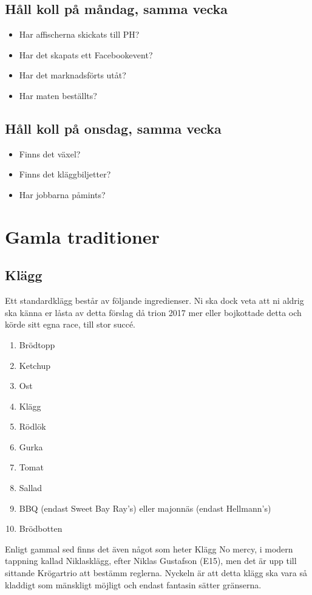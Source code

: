 \documentclass[10pt]{article}
\begin{document}
\subsection*{Håll koll på måndag, samma vecka}
\begin{itemize}
    \item Har affischerna skickats till PH?
	\item Har det skapats ett Facebookevent?
	\item Har det marknadsförts utåt?
	\item Har maten beställts?
\end{itemize}

\subsection*{Håll koll på onsdag, samma vecka}
\begin{itemize}
    \item Finns det växel?
    \item Finns det kläggbiljetter?
	\item Har jobbarna påmints?
\end{itemize}

\section{Gamla traditioner}
\subsection{Klägg}
Ett standardklägg består av följande ingredienser. Ni ska dock veta att ni aldrig ska känna er låsta av detta förslag då trion 2017 mer eller bojkottade detta och körde sitt egna race, till stor succé.
\begin{enumerate}
	\item Brödtopp
	\item Ketchup
	\item Ost
	\item Klägg
	\item Rödlök
	\item Gurka
	\item Tomat
	\item Sallad
	\item BBQ (endast Sweet Bay Ray's) eller majonnäs (endast Hellmann's)
	\item Brödbotten
\end{enumerate}
Enligt gammal sed finns det även något som heter Klägg No mercy, i modern tappning kallad Niklasklägg, efter Niklas Gustafson (E15), men det är upp till sittande Krögartrio att bestämm reglerna. Nyckeln är att detta klägg ska vara så kladdigt som mänskligt möjligt och endast fantasin sätter gränserna.
\end{document}
